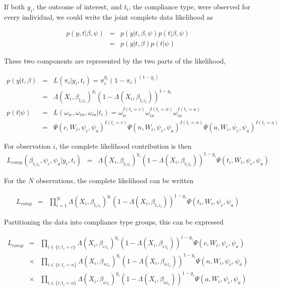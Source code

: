 \documentclass[12pt]{article}
\begin{document}
If both $y_i$, the outcome of interest, and $t_i$, the compliance
type, were observed for every individual, we could write the joint
complete data likelihood as

\begin{eqnarray*}
p(y, t | \beta, \psi) & = & p(y|t, \beta, \psi)p(t| \beta, \psi) \\
& = & p(y|t, \beta)p(t| \psi) 
\end{eqnarray*}

These two components are represented by the two parts of the
likelihood, 

\begin{eqnarray*}
p(y|t, \beta) & = & L(\pi_i | y_i, t_i) = \pi_i^{y_i}
(1-\pi_i)^{(1-y_i)} \\ & = & \Lambda(X_i,\beta_{t_iz_i})^{y_i}
\left(1- \Lambda(X_i,\beta_{t_iz_i}) \right)^{1-y_i} \\
p(t|\psi) & = & L(\omega_{ic}, \omega_{in}, \omega_{ia} | t_i) =
\omega_{ic}^{I(t_i=c)}\omega_{in}^{I(t_i=n)}\omega_{ia}^{I(t_i=a)} \\
& = & \Psi(c,W_i,\psi_c, \psi_a)^{I(t_i=c)}\Psi(n,W_i,\psi_c, \psi_a)^{I(t_i=n)} \Psi(a,W_i,\psi_c, \psi_a)^{I(t_i=a)} 
\end{eqnarray*}

For observation $i$, the complete likelihood contribution is then
\begin{eqnarray*}
L_{comp}(\beta_{t_iz_i}, \psi_c, \psi_a | y_i, t_i) & = & 
\Lambda(X_i,\beta_{t_iz_i})^{y_i}
\left(1- \Lambda(X_i,\beta_{t_iz_i}) \right)^{1-y_i} 
\Psi(t_i, W_i, \psi_c, \psi_a)
\end{eqnarray*}

For the $N$ observations, the complete likelihood can be written

\begin{eqnarray*}
L_{comp} & = & \prod_{i=1}^N  \Lambda(X_i,\beta_{t_iz_i})^{y_i}
\left(1- \Lambda(X_i,\beta_{t_iz_i}) \right)^{1-y_i} 
\Psi(t_i, W_i, \psi_c, \psi_a)
\end{eqnarray*}

Partitioning the data into compliance type groups, this can be expressed

\begin{eqnarray*}
L_{comp} & = & \prod_{i \in \{i:t_i = c\}}
\Lambda(X_i,\beta_{cz_i})^{y_i}
\left(1- \Lambda(X_i,\beta_{cz_i}) \right)^{1-y_i} 
\Psi(c, W_i, \psi_c, \psi_a)  \\
& \times & \prod_{i \in \{i:t_i = n\}} \Lambda(X_i,\beta_{nz_i})^{y_i}
\left(1- \Lambda(X_i,\beta_{nz_i}) \right)^{1-y_i} 
\Psi(n, W_i, \psi_c, \psi_a) \\
& \times & \prod_{i \in \{i:t_i = a\}}
\Lambda(X_i,\beta_{az_i})^{y_i} \left(1-
\Lambda(X_i,\beta_{az_i}) \right)^{1-y_i}
\Psi(a, W_i, \psi_c, \psi_a) 
\end{eqnarray*}
\end{document}
